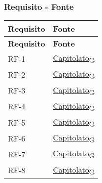 \subsubsection{Requisito - Fonte}
\begin{longtable}{|>{\centering\arraybackslash}m{}|>{\centering\arraybackslash}m{}|}
	\hline
	\textbf{Requisito} & \textbf{Fonte}                                                                                                                                                                                                                                       \\\hline
	\endfirsthead
	\hline
	\textbf{Requisito} & \textbf{Fonte}                                                                                                                                                                                                                                       \\\hline
	\endhead
	RF-1            & \href{https://7last.github.io/docs/pb/documentazione-interna/glossario\#capitolato}{Capitolato\textsubscript{G}} \\\hline
	RF-2            & \href{https://7last.github.io/docs/pb/documentazione-interna/glossario\#capitolato}{Capitolato\textsubscript{G}} \\\hline
	RF-3            & \href{https://7last.github.io/docs/pb/documentazione-interna/glossario\#capitolato}{Capitolato\textsubscript{G}} \\\hline
	RF-4            & \href{https://7last.github.io/docs/pb/documentazione-interna/glossario\#capitolato}{Capitolato\textsubscript{G}} \\\hline
	RF-5            & \href{https://7last.github.io/docs/pb/documentazione-interna/glossario\#capitolato}{Capitolato\textsubscript{G}} \\\hline
	RF-6            & \href{https://7last.github.io/docs/pb/documentazione-interna/glossario\#capitolato}{Capitolato\textsubscript{G}} \\\hline
	RF-7            & \href{https://7last.github.io/docs/pb/documentazione-interna/glossario\#capitolato}{Capitolato\textsubscript{G}} \\\hline
	RF-8            & \href{https://7last.github.io/docs/pb/documentazione-interna/glossario\#capitolato}{Capitolato\textsubscript{G}} \\\hline

\end{longtable}
